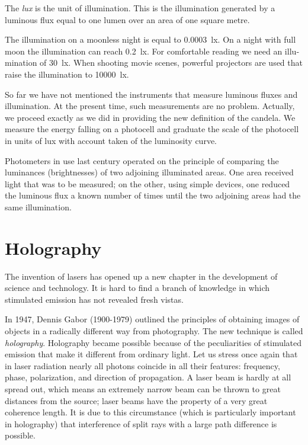The \emph{lux} is the unit of illumination. This is the illumi­nation generated by a luminous flux equal to one lumen over an area of one square metre.

The illumination on a moonless night is equal to \SI{0.0003}{\lux}. On a night with full moon the illumination can reach \SI{0.2}{\lux}. For comfortable reading we need an illu­mination of \SI{30}{\lux}. When shooting movie scenes, powerful projectors are used that raise the illumination to \SI{10000}{\lux}.

So far we have not mentioned the instruments that measure luminous fluxes and illumination. At the present time, such measurements are no problem. Actually, we proceed exactly as we did in providing the new definition of the candela. We measure the energy falling on a pho­tocell and graduate the scale of the photocell in units
of lux with account taken of the luminosity curve.

Photometers in use last century operated on the prin­ciple of comparing the luminances (brightnesses) of two adjoining illuminated areas. One area received light that was to be measured; on the other, using simple devices, one reduced the luminous flux a known number of times until the two adjoining areas had the same illumination.

\section{Holography}

The invention of lasers has opened up a new chapter in the development of science and technology. It is hard to find a branch of knowledge in which stimulated emis­sion has not revealed fresh vistas.

In 1947, Dennis Gabor (1900-1979) outlined the principles of obtaining images of objects in a radically different way from photography. The new technique is called \emph{holo­graphy}. Holography became possible because of the pe­culiarities of stimulated emission that make it different from ordinary light. Let us stress once again that in laser radiation nearly all photons coincide in all their features: frequency, phase, polarization, and direction of propagation. A laser beam is hardly at all spread out, which means an extremely narrow beam can be thrown to great distances from the source; laser beams have the property of a very great coherence length. It is due to this circumstance (which is particularly important in holography) that interference of split rays with a large path difference is possible.

